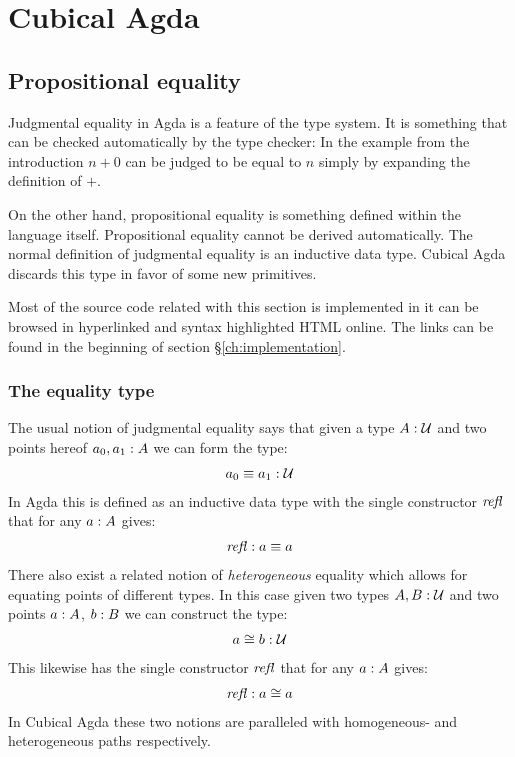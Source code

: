 \chapter{Cubical Agda}
\section{Propositional equality}
Judgmental equality in Agda is a feature of the type system. It is
something that can be checked automatically by the type checker: In
the example from the introduction $n + 0$ can be judged to be equal to
$n$ simply by expanding the definition of $+$.

On the other hand, propositional equality is something defined within
the language itself. Propositional equality cannot be derived
automatically. The normal definition of judgmental equality is an
inductive data type. Cubical Agda discards this type in favor of some
new primitives.

Most of the source code related with this section is implemented in
\cite{cubical-demo} it can be browsed in hyperlinked and syntax
highlighted HTML online. The links can be found in the beginning of
section \S\ref{ch:implementation}.

\subsection{The equality type}
The usual notion of judgmental equality says that given a type $A \mathrel{:}
\mathcal{U}$ and two points hereof $a_0, a_1 \mathrel{:} A$ we can form the type:
%
\begin{align}
  a_0 \equiv a_1 \mathrel{:} \mathcal{U}
\end{align}
%
In Agda this is defined as an inductive data type with the single
constructor $\refl$ that for any $a \mathrel{:} A$ gives:
%
\begin{align}
  \refl \tp a \equiv a
\end{align}
%
There also exist a related notion of \emph{heterogeneous} equality which allows
for equating points of different types. In this case given two types $A, B \mathrel{:}
\mathcal{U}$ and two points $a \mathrel{:} A$, $b \mathrel{:} B$ we can construct the type:
%
\begin{align}
  a \cong b \mathrel{:} \mathcal{U}
\end{align}
%
This likewise has the single constructor $\refl$ that for any $a \mathrel{:}
A$ gives:
%
\begin{align}
  \refl \tp a \cong a
\end{align}
%
In Cubical Agda these two notions are paralleled with homogeneous- and
heterogeneous paths respectively.
%
